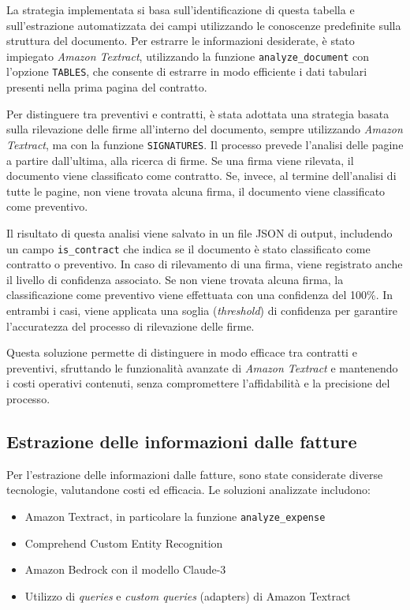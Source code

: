 La strategia implementata si basa sull'identificazione di questa tabella e sull'estrazione automatizzata dei campi utilizzando le conoscenze predefinite sulla struttura del documento. Per estrarre le informazioni desiderate, è stato impiegato \emph{Amazon Textract}, utilizzando la funzione \texttt{analyze\_document} con l'opzione \texttt{TABLES}, che consente di estrarre in modo efficiente i dati tabulari presenti nella prima pagina del contratto.

Per distinguere tra preventivi e contratti, è stata adottata una strategia basata sulla rilevazione delle firme all'interno del documento, sempre utilizzando \emph{Amazon Textract}, ma con la funzione \texttt{SIGNATURES}. Il processo prevede l'analisi delle pagine a partire dall'ultima, alla ricerca di firme. Se una firma viene rilevata, il documento viene classificato come contratto. Se, invece, al termine dell'analisi di tutte le pagine, non viene trovata alcuna firma, il documento viene classificato come preventivo.

Il risultato di questa analisi viene salvato in un file JSON di output, includendo un campo \texttt{is\_contract} che indica se il documento è stato classificato come contratto o preventivo. In caso di rilevamento di una firma, viene registrato anche il livello di confidenza associato. Se non viene trovata alcuna firma, la classificazione come preventivo viene effettuata con una confidenza del 100\%. In entrambi i casi, viene applicata una soglia (\textit{threshold}) di confidenza per garantire l'accuratezza del processo di rilevazione delle firme.

Questa soluzione permette di distinguere in modo efficace tra contratti e preventivi, sfruttando le funzionalità avanzate di \emph{Amazon Textract} e mantenendo i costi operativi contenuti, senza compromettere l'affidabilità e la precisione del processo.

\subsection{Estrazione delle informazioni dalle fatture}
\label{subsec:estrazione-fatture}
Per l'estrazione delle informazioni dalle fatture, sono state considerate diverse tecnologie, valutandone costi ed efficacia. Le soluzioni analizzate includono:

\begin{itemize}
    \item Amazon Textract, in particolare la funzione \texttt{analyze\_expense}
    \item Comprehend Custom Entity Recognition
    \item Amazon Bedrock con il modello Claude-3
    \item Utilizzo di \textit{queries} e \textit{custom queries} (adapters) di Amazon Textract
\end{itemize}

